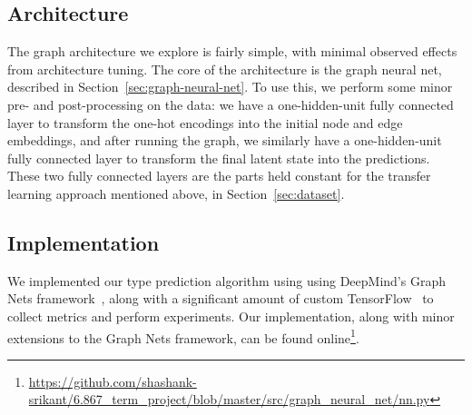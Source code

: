 \subsection{Architecture}

The graph architecture we explore is fairly simple, with minimal observed effects from architecture tuning.
The core of the architecture is the graph neural net, described in Section~\ref{sec:graph-neural-net}.
To use this, we perform some minor pre- and post-processing on the data: we have a one-hidden-unit fully connected layer to transform the one-hot encodings into the initial node and edge embeddings, and after running the graph, we similarly have a one-hidden-unit fully connected layer to transform the final latent state into the predictions.
These two fully connected layers are the parts held constant for the transfer learning approach mentioned above, in Section~\ref{sec:dataset}.

\subsection{Implementation}

We implemented our type prediction algorithm using using DeepMind's Graph Nets framework~\cite{deepmind2018graph}, along with a significant amount of custom TensorFlow~\cite{google2015tensorflow} to collect metrics and perform experiments.
Our implementation, along with minor extensions to the Graph Nets framework, can be found online\footnote{\url{https://github.com/shashank-srikant/6.867_term_project/blob/master/src/graph_neural_net/nn.py}}.


